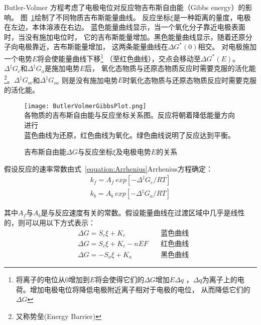 Butler-Volmer 方程考虑了电极电位对反应物吉布斯自由能（Gibbs energy）的影响。
图~\ref{fig:ButlerVolmerGibbsPlot}绘制了不同物质吉布斯能量曲线。
反应坐标$\xi$是一种距离的量度，电极在左边，本体溶液在右边。
蓝色能量曲线显示，当一个氧化分子靠近电极表面时，当没有施加电位时，
它的吉布斯能量增加。黑色能量曲线显示，随着还原分子向电极靠近，吉布斯能量增加，
这两条能量曲线在$\Delta G^{*}(0)$相交。
对电极施加一个电势$E$将会使能量曲线下移\footnote{
    将离子的电位从$0$增加到$E$将会使得它们的$\Delta G$增加$E\Delta q$
    ，$\Delta q$为离子上的电荷。增加电极电位将降低电极附近离子相对于电极的电位，
    从而降低它们的$\Delta G$
}
（至红色曲线），交点会移动至$\Delta G^{*}(E)$。
$\Delta ^{\ddagger }G_{c}$和$\Delta ^{\ddagger }G_{a}$是施加电势$E$后，
氧化态物质与还原态物质反应时需要克服的活化能\footnote{又称势垒(Energy Barrier)}。$\Delta ^{\ddagger }G_{oc}$和$\Delta ^{\ddagger }G_{oa}$
则是没有施加电势$E$时氧化态物质与还原态物质反应时需要克服的活化能\cite{CITEREFNewmanThomas-Alyea2004}。
\begin{figure}[H]
    \centering
    \texttt{[image: ButlerVolmerGibbsPlot.png]}\\
    各物质的吉布斯自由能与反应坐标关系图。反应将朝着降低能量方向进行\\
    蓝色曲线为还原，红色曲线为氧化。绿色曲线说明了反应达到平衡。
    \caption{吉布斯自由能$\Delta G$与反应坐标$\xi$及电极电势$E$的关系\cite{Gibbs}}
    \label{fig:ButlerVolmerGibbsPlot}
\end{figure}

假设反应的速率常数由式~\ref{equation:Arrhenius}Arrhenius方程确定：
\begin{equation}
    \begin{aligned}
        k_ {f} = A_ {f} \ exp [-\Delta ^ {\ddagger} G_ {c} / RT]\\
        k_ {b} = A_ {b} \ exp [-\Delta ^ {\ddagger} G_ {a} / RT]%
    \end{aligned}
\end{equation}

其中$A_ {f}$与$A_ {b}$是与反应速度有关的常数。假设能量曲线在过渡区域中几乎是线性的，则可以用以下方式表示：
\begin{equation}
    \begin{aligned}
        &\Delta G = S_{c} \xi + K_{c} & \mbox{蓝色曲线}\\
        &\Delta G = S_{c} \xi + K_{c} -nEF \quad &\mbox{红色曲线}\\
        &\Delta G =- S_{a} \xi + K_{a} \quad &\mbox{黑色曲线}
    \end{aligned}
\end{equation}

